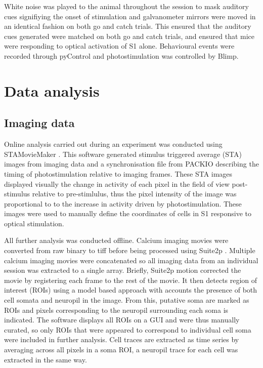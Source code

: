White noise was played to the animal throughout the session to mask auditory cues signifiying the onset of stimulation and galvanometer mirrors were moved in an identical fashion on both go and catch trials. This ensured that the auditory cues generated were matched on both go and catch trials, and ensured that mice were responding to optical activation of S1 alone. Behavioural events were recorded through pyControl and photostimulation was controlled by Blimp.

\section{Data analysis}

\subsection{Imaging data}

Online analysis carried out during an experiment was conducted using STAMovieMaker \cite{russell_influence_2019}. This software generated stimulus triggered average (STA) images from imaging data and a synchronisation file from PACKIO describing the timing of photostimulation relative to imaging frames. These STA images displayed visually the change in activity of each pixel in the field of view post-stimulus relative to pre-stimlulus, thus the pixel intensity of the image was proportional to to the increase in activity driven by photostimulation. These images were used to manually define the coordinates of cells in S1 responsive to optical stimulation.

All further analysis was conducted offline. Calcium imaging movies were converted from raw binary to tiff before being processed using Suite2p \cite{pachitariu_suite2p_2016}. Multiple calcium imaging movies were concatenated so all imaging data from an individual session was extracted to a single array. Briefly, Suite2p motion corrected the movie by registering each frame to the rest of the movie. It then detects region of interest (ROIs) using a model based approach with accounts the presence of both cell somata and neuropil in the image. From this, putative soma are marked as ROIs and pixels corresponding to the neuropil surrounding each soma is indicated. The software displays all ROIs on a GUI and were thus manually curated, so only ROIs that were appeared to correspond to individual cell soma were included in further analysis. Cell traces are extracted as time series by averaging across all pixels in a soma ROI, a neuropil trace for each cell was extracted in the same way.

